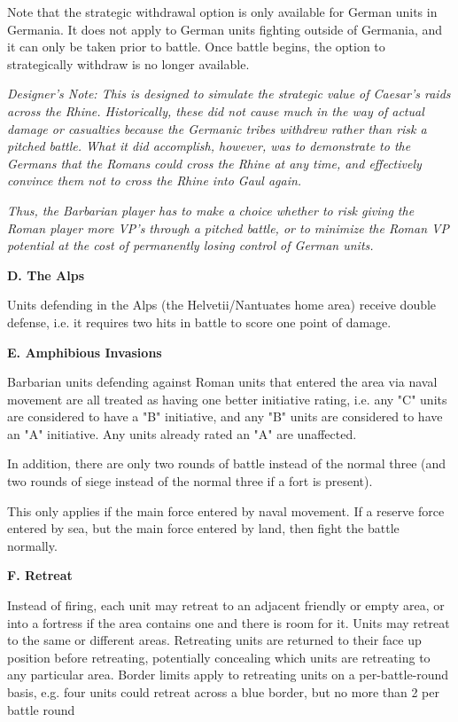 Note that the strategic withdrawal option is only available for German units in Germania. It does not apply to German units fighting outside of Germania, and it can only be taken prior to battle. Once battle begins, the option to strategically withdraw is no longer available.

\textit{Designer's Note: This is designed to simulate the strategic value of Caesar's raids across the Rhine. Historically, these did not cause much in the way of actual damage or casualties because the Germanic tribes withdrew rather than risk a pitched battle. What it did accomplish, however, was to demonstrate to the Germans that the Romans could cross the Rhine at any time, and effectively convince them not to cross the Rhine into Gaul again.}
\par
\textit{Thus, the Barbarian player has to make a choice whether to risk giving the Roman player more VP's through a pitched battle, or to minimize the Roman VP potential at the cost of permanently losing control of German units.}

\textbf{D. The Alps}
\par
Units defending in the Alps (the Helvetii/Nantuates home area) receive double defense, i.e. it requires two hits in battle to score one point of damage.

\textbf{E. Amphibious Invasions}
\par
Barbarian units defending against Roman units that entered the area via naval movement are all treated as having one better initiative rating, i.e. any "C" units are considered to have a "B" initiative, and any "B" units are considered to have an "A" initiative. Any units already rated an "A" are unaffected.

In addition, there are only two rounds of battle instead of the normal three (and two rounds of siege instead of the normal three if a fort is present). 

This only applies if the main force entered by naval movement. If a reserve force entered by sea, but the main force entered by land, then fight the battle normally. 

\textbf{F. Retreat}
\par
Instead of firing, each unit may retreat to an adjacent friendly or empty area, or into a fortress if the area contains one and there is room for it. Units may retreat to the same or different areas. Retreating units are returned to their face up position before retreating, potentially concealing which units are retreating to any particular area. Border limits apply to retreating units on a per-battle-round basis, e.g. four units could retreat across a blue border, but no more than 2 per battle round

